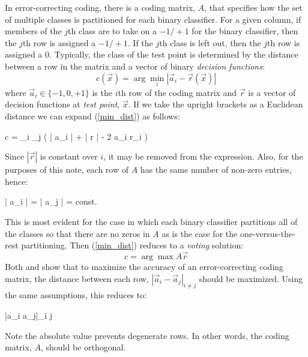 In error-correcting coding, there is a coding matrix, $A$, that specifies
how the set of multiple classes is partitioned for each binary classifier.
For a given column, 
if members of the $j$th class are to take on a $-1/+1$ for the
binary classifier, then the $j$th row is assigned a $-1/+1$.
If the $j$th class is left out, then the $j$th row is assigned a $0$.
Typically, the class of the test point is determined by the distance between
a row in the matrix and a vector of binary {\it decision functions}:
\begin{equation}
	c(\vec x) = \arg \min_i | \vec a_i - \vec r(\vec x) |
	\label{min_dist}
\end{equation}
where $\vec a_i\in \lbrace -1,0,+1 \rbrace$ 
is the $i$th row of the coding matrix and 
$\vec r$ is a vector of decision functions at {\it test point}, $\vec x$.
If we take the upright brackets as a Euclidean distance we can expand (\ref{min_dist}) as follows:
\begin{eqnnon}
	c = \arg \min_i \sum_j \left ( | \vec a_i | + | \vec r | - 2 \vec a_i  \cdot \vec r_i  \right ) 
\end{eqnnon}
Since $| \vec r |$ is constant over $i$, it may be removed from the expression.
Also, for the purposes of this note,
each row of $A$ has the same number of non-zero entries, hence:
\begin{eqnnon}
	| \vec a_i | = | \vec a_j | = const.
\end{eqnnon}
This is most evident for the case in which each binary classifier partitions
all of the classes so that there are no zeros in $A$
as is the case for the one-versus-the-rest partitioning.
Then (\ref{min_dist}) reduces to a {\it voting} solution:
\begin{equation}
	c = \arg \max A \vec r \label{voting}
\end{equation}
Both \citet{Allwein_etal2000} and \citet{Windeatt_Ghaderi2002} show that to
maximize the accuracy of an error-correcting coding matrix, the distance
between each row, $|\vec a_i - \vec a_j|_{i \ne j}$ should be maximized.
Using the same assumptions, this reduces to:
\begin{eqnnon}
	\min |\vec a_i \cdot \vec a_j|_{i \ne j}
\end{eqnnon}
Note the absolute value prevents degenerate rows.
In other words, the coding matrix, $A$, should be orthogonal.

